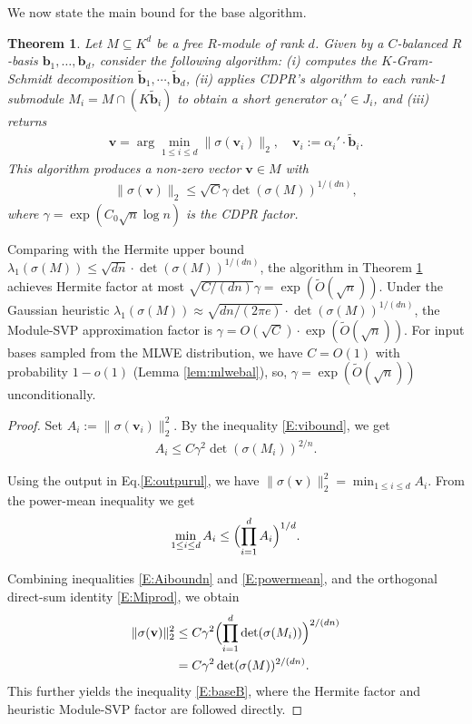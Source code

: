\documentclass[11pt,a4paper]{article}
\theoremstyle{plain}
\newtheorem{theorem}{Theorem}[section]
\theoremstyle{definition}
\theoremstyle{remark}
\newcommand{\tO}{\tilde{O}}
\begin{document}
We now state the main bound for the base algorithm. 

\begin{theorem}\label{T:base}
  Let $M\subseteq K^d$ be a free $R$-module of rank $d$. Given by a $C$-balanced $R$-basis $\mathbf{b}_1, \dots, \mathbf{b}_d$, consider the following algorithm: (i) computes the $K$-Gram-Schmidt decomposition   $\tilde{\mathbf{b}}_1,\cdots,\tilde{\mathbf{b}}_d$, (ii) applies CDPR's algorithm to each rank-1 submodule $M_i=M\cap(K\tilde{\mathbf{b}}_i)$ to obtain a short generator $\alpha_i'\in J_i$, and (iii) returns 
  \begin{align}
    \mathbf{v}=\arg\min_{1\le i\le d}\|\sigma(\mathbf{v}_i)\|_2,
    \quad \mathbf{v}_i:=\alpha_i'\cdot\tilde{\mathbf{b}}_i.
    \label{E:outpurul}
  \end{align}
  This algorithm produces a non-zero vector $\mathbf{v}\in M$ with
  \begin{align}
    \|\sigma(\mathbf{v})\|_2 \le
    \sqrt{C} \gamma \det(\sigma(M))^{1/(dn)},
    \label{E:baseB}
  \end{align}
  where $\gamma=\exp(C_0\sqrt n\log n)$ is the CDPR factor. 
\end{theorem}

Comparing with the Hermite upper bound   $\lambda_1(\sigma(M))\le\sqrt{dn}\cdot\det(\sigma(M))^{1/(dn)}$, the algorithm in Theorem \ref{T:base} achieves Hermite factor at most  $\sqrt{C/(dn)}\gamma=\exp(\tO(\sqrt{n}))$. Under the Gaussian heuristic $\lambda_1(\sigma(M))\approx\sqrt{dn/(2\pi e)}\cdot\det(\sigma(M))^{1/(dn)}$, the Module-SVP approximation factor is $\gamma=O(\sqrt{C})\cdot\exp(\tO(\sqrt n))$. For input bases sampled from the MLWE distribution, we have $C=O(1)$ with probability $1-o(1)$ (Lemma \ref{lem:mlwebal}), so, $\gamma=\exp(\tO(\sqrt{n}))$ unconditionally.

\begin{proof}
Set $A_i:=\|\sigma(\mathbf{v}_i)\|_2^2$. By the inequality \eqref{E:vibound}, we get 
\begin{align}
  A_i \le C\gamma^2\det(\sigma(M_i))^{2/n}.
  \label{E:Aiboundn}
\end{align}

Using the output in Eq.\eqref{E:outpurul}, we have $\|\sigma(\mathbf{v})\|_2^2=\min_{1\le i\le d} A_i$. From the power-mean inequality we get
\begin{align}
  \min_{1\le i\le d} A_i \le
  \Bigl(\prod_{i=1}^d A_i\Bigr)^{1/d}.
  \label{E:powermean}
\end{align}

Combining inequalities \eqref{E:Aiboundn} and \eqref{E:powermean}, and the orthogonal direct-sum identity \eqref{E:Miprod}, we obtain 
\begin{align}
  \|\sigma(\mathbf{v})\|_2^2
  &\le C\gamma^2\Bigl(\prod_{i=1}^d\det(\sigma(M_i))\Bigr)^{2/(dn)} \notag\\
  &=C\gamma^2\det(\sigma(M))^{2/(dn)}.
  \label{E:afterpm}
\end{align}
This further yields the inequality \eqref{E:baseB}, where the Hermite factor and heuristic Module-SVP factor are followed directly.
\end{proof}
\end{document}
